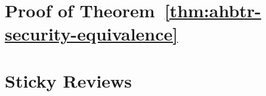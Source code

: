 \documentclass[
  layout=6x9,
  envelope-icons=no,
  format=lncs-submission-draft
]{crypto-paper}
\begin{document}




\LaomianBody















\LaomianAcknowledgments


\LaomianAppendix

% 

\section{Proof of Theorem~\ref{thm:ahbtr-security-equivalence}}
\label{sec:deferred}



\section{Sticky Reviews}
\label{sec:sticky-reviews}


\end{document}
